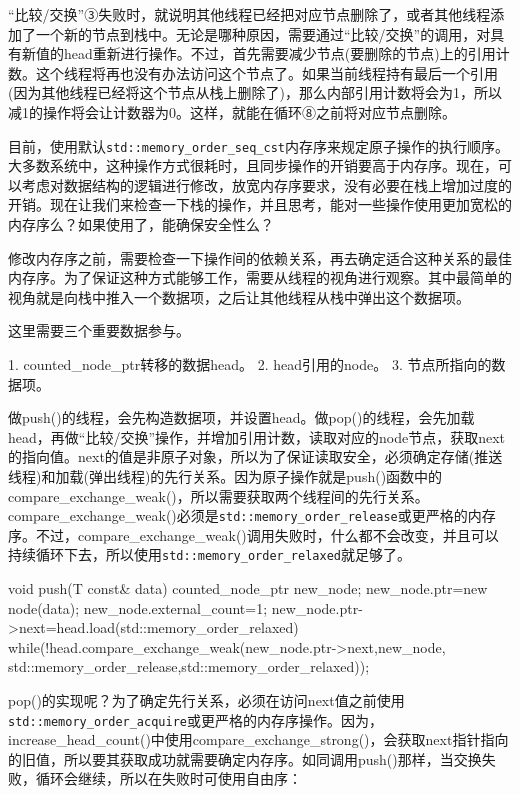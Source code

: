 “比较/交换”③失败时，就说明其他线程已经把对应节点删除了，或者其他线程添加了一个新的节点到栈中。无论是哪种原因，需要通过“比较/交换”的调用，对具有新值的head重新进行操作。不过，首先需要减少节点(要删除的节点)上的引用计数。这个线程将再也没有办法访问这个节点了。如果当前线程持有最后一个引用(因为其他线程已经将这个节点从栈上删除了)，那么内部引用计数将会为1，所以减1的操作将会让计数器为0。这样，就能在循环⑧之前将对应节点删除。

目前，使用默认\texttt{std::memory\_order\_seq\_cst}内存序来规定原子操作的执行顺序。大多数系统中，这种操作方式很耗时，且同步操作的开销要高于内存序。现在，可以考虑对数据结构的逻辑进行修改，放宽内存序要求，没有必要在栈上增加过度的开销。现在让我们来检查一下栈的操作，并且思考，能对一些操作使用更加宽松的内存序么？如果使用了，能确保安全性么？


修改内存序之前，需要检查一下操作间的依赖关系，再去确定适合这种关系的最佳内存序。为了保证这种方式能够工作，需要从线程的视角进行观察。其中最简单的视角就是向栈中推入一个数据项，之后让其他线程从栈中弹出这个数据项。

这里需要三个重要数据参与。

1. counted\_node\_ptr转移的数据head。
2. head引用的node。
3. 节点所指向的数据项。

做push()的线程，会先构造数据项，并设置head。做pop()的线程，会先加载head，再做“比较/交换”操作，并增加引用计数，读取对应的node节点，获取next的指向值。next的值是非原子对象，所以为了保证读取安全，必须确定存储(推送线程)和加载(弹出线程)的先行关系。因为原子操作就是push()函数中的compare\_exchange\_weak()，所以需要获取两个线程间的先行关系。compare\_exchange\_weak()必须是\texttt{std::memory\_order\_release}或更严格的内存序。不过，compare\_exchange\_weak()调用失败时，什么都不会改变，并且可以持续循环下去，所以使用\texttt{std::memory\_order\_relaxed}就足够了。

\begin{cpp}
void push(T const& data)
{
  counted_node_ptr new_node;
  new_node.ptr=new node(data);
  new_node.external_count=1;
  new_node.ptr->next=head.load(std::memory_order_relaxed)
  while(!head.compare_exchange_weak(new_node.ptr->next,new_node,
    std::memory_order_release,std::memory_order_relaxed));
}
\end{cpp}

pop()的实现呢？为了确定先行关系，必须在访问next值之前使用\texttt{std::memory\_order\_acquire}或更严格的内存序操作。因为，increase\_head\_count()中使用compare\_exchange\_strong()，会获取next指针指向的旧值，所以要其获取成功就需要确定内存序。如同调用push()那样，当交换失败，循环会继续，所以在失败时可使用自由序：

